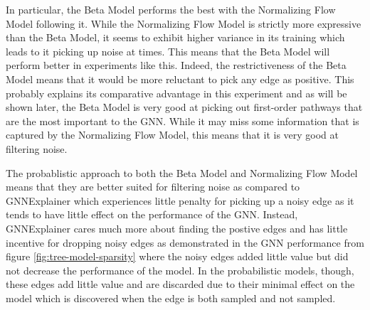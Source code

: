 In particular, the Beta Model performs the best with the Normalizing Flow Model following it. While the Normalizing Flow Model is strictly more expressive than the Beta Model, it seems to exhibit higher variance in its training which leads to it picking up noise at times. This means that the Beta Model will perform better in experiments like this. Indeed, the restrictiveness of the Beta Model means that it would be more reluctant to pick any edge as positive. This probably explains its comparative advantage in this experiment and as will be shown later, the Beta Model is very good at picking out first-order pathways that are the most important to the GNN. While it may miss some information that is captured by the Normalizing Flow Model, this means that it is very good at filtering noise. 

The probablistic approach to both the Beta Model and Normalizing Flow Model means that they are better suited for filtering noise as compared to GNNExplainer which experiences little penalty for picking up a noisy edge as it tends to have little effect on the performance of the GNN. Instead, GNNExplainer cares much more about finding the postive edges and has little incentive for dropping noisy edges as demonstrated in the GNN performance from figure \ref{fig:tree-model-sparsity} where the noisy edges added little value but did not decrease the performance of the model. In the probabilistic models, though, these edges add little value and are discarded due to their minimal effect on the model which is discovered when the edge is both sampled and not sampled. 

